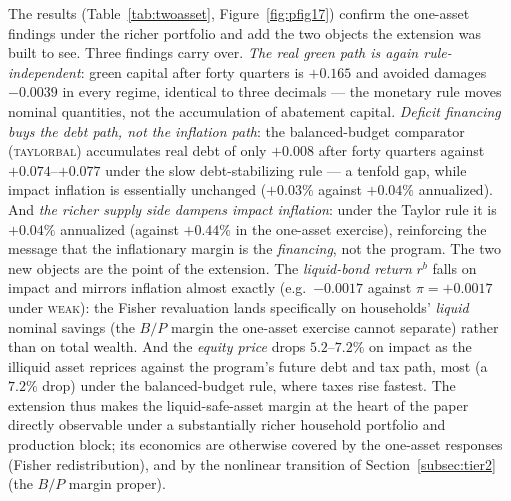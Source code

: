 \documentclass[12pt]{article}
\begin{document}
The results (Table~\ref{tab:twoasset}, Figure~\ref{fig:pfig17}) confirm the
one-asset findings under the richer portfolio and add the two objects the
extension was built to see. Three findings carry over. \emph{The real green
path is again rule-independent}: green capital after forty quarters is
$+0.165$ and avoided damages $-0.0039$ in every regime, identical to
three decimals --- the monetary rule moves nominal quantities, not the
accumulation of abatement capital. \emph{Deficit financing buys the debt
path, not the inflation path}: the balanced-budget comparator
(\textsc{taylorbal}) accumulates real debt of only $+0.008$ after forty
quarters against $+0.074$--$+0.077$ under the slow debt-stabilizing rule ---
a tenfold gap, while impact inflation is essentially unchanged
($+0.03\%$ against $+0.04\%$ annualized). And \emph{the richer supply side
dampens impact inflation}: under the Taylor rule it is $+0.04\%$ annualized
(against $+0.44\%$ in the one-asset exercise), reinforcing the message that
the inflationary margin is the \emph{financing}, not the program. The two
new objects are the point of the extension. The \emph{liquid-bond return}
$r^b$ falls on impact and mirrors inflation almost exactly (e.g.\ $-0.0017$
against $\pi=+0.0017$ under \textsc{weak}): the Fisher revaluation lands
specifically on households' \emph{liquid} nominal savings (the $B/P$
margin the one-asset exercise cannot separate) rather than on total
wealth. And the \emph{equity price} drops $5.2$--$7.2\%$ on impact as the
illiquid asset reprices against the program's future debt and tax path,
most (a $7.2\%$ drop) under the balanced-budget rule, where taxes rise
fastest. The extension thus makes the liquid-safe-asset margin at the heart
of the paper directly observable under a substantially
richer household portfolio and production block; its economics are otherwise
covered by the one-asset responses (Fisher redistribution), and by the
nonlinear transition of Section~\ref{subsec:tier2} (the $B/P$ margin proper).
\end{document}
